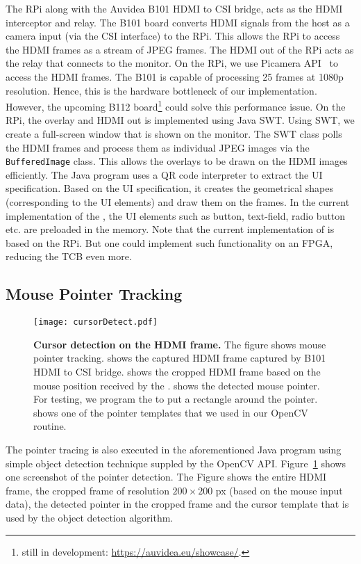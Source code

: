 The RPi along with the Auvidea B101 HDMI to CSI bridge, acts as the HDMI interceptor and relay. The B101 board converts HDMI signals from the host as a camera input (via the CSI interface) to the RPi. This allows the RPi to access the HDMI frames as a stream of JPEG frames. The HDMI out of the RPi acts as the relay that connects to the monitor. On the RPi, we use Picamera API~\cite{picamera} to access the HDMI frames. The B101 is capable of processing 25 frames at 1080p resolution. Hence, this is the hardware bottleneck of our implementation. However, the upcoming B112 board\footnote{still in development: \url{https://auvidea.eu/showcase/}.} could solve this performance issue.
On the RPi, the overlay and HDMI out is implemented using Java SWT. Using SWT, we create a full-screen window that is shown on the monitor. The SWT class polls the HDMI frames and process them as individual JPEG images via the \texttt{BufferedImage} class. This allows the overlays to be drawn on the HDMI images efficiently. The Java program uses a QR code interpreter to extract the UI specification. Based on the UI specification, it creates the geometrical shapes (corresponding to the UI elements) and draw them on the frames. In the current implementation of the \name, the UI elements such as button, text-field, radio button etc. are preloaded in the \device memory. Note that the current implementation of \device is based on the RPi. But one could implement such functionality on an FPGA, reducing the TCB even more. 


\subsection{Mouse Pointer Tracking}

\begin{figure}[t]
\centering
\texttt{[image: cursorDetect.pdf]}
\caption{\textbf{Cursor detection on the HDMI frame.} The figure shows \name mouse pointer tracking. \one shows the captured HDMI frame captured by B101 HDMI to CSI bridge. \two shows the cropped HDMI frame based on the mouse position received by the \device. \three shows the detected mouse pointer. For testing, we program the \device to put a rectangle around the pointer. \four shows one of the pointer templates that we used in our OpenCV routine.}
\spacesave
\label{fig:cursorDetect}
\centering
\end{figure} 

The pointer tracing is also executed in the aforementioned Java program using simple object detection technique suppled by the OpenCV API. Figure~\ref{fig:cursorDetect} shows one screenshot of the pointer detection. The Figure shows the entire HDMI frame, the cropped frame of resolution $200 \times 200$ px (based on the mouse input data), the detected pointer in the cropped frame and the cursor template that is used by the object detection algorithm.



